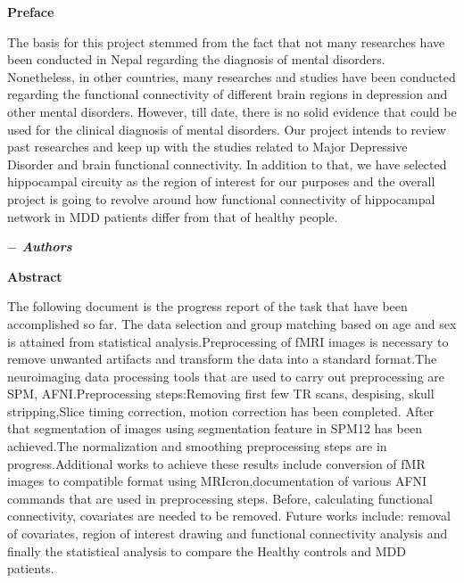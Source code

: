 \documentclass[12pt]{article}
\begin{document}


\clearpage
\setcounter{page}{1}
\hskip180pt {\textbf{\centering \Large Preface} }
\vskip40pt

\noindent
The basis for this project stemmed from the fact that not many
researches have been conducted in Nepal regarding the diagnosis of
mental disorders. Nonetheless, in other countries, many researches and
studies have been conducted regarding the functional connectivity of
different brain regions in depression and other mental
disorders. However, till date, there is no solid evidence that could
be used for the clinical diagnosis of mental disorders. Our project
intends to review past researches and keep up with the studies related
to Major Depressive Disorder and brain functional connectivity. In
addition to that, we have selected hippocampal circuity as the region
of interest for our purposes and the overall project is going to
revolve around how functional connectivity of hippocampal network in
MDD patients differ from that of healthy people.

\hspace*{133mm}\textbf{\textit {$-$ Authors}}
\newpage

\hskip180pt {\textbf{\centering \Large Abstract} }
\vskip40pt

  \noindent
  The following document is the progress report of the task that have
  been accomplished so far. The data selection and group matching
  based on age and sex is attained from statistical
  analysis.Preprocessing of fMRI images is necessary to remove
  unwanted artifacts and transform the data into a standard format.The
  neuroimaging data processing tools that are used to carry out
  preprocessing are SPM, AFNI.Preprocessing steps:Removing first few
  TR scans, despising, skull stripping,Slice timing correction, motion
  correction has been completed. After that segmentation of images
  using segmentation feature in SPM12 has been achieved.The
  normalization and smoothing preprocessing steps are in
  progress.Additional works to achieve these results include
  conversion of fMR images to compatible format using
  MRIcron,documentation of various AFNI commands that are used in
  preprocessing steps. Before, calculating functional connectivity,
  covariates are needed to be removed. Future works include: removal
  of covariates, region of interest drawing and functional
  connectivity analysis and finally the statistical analysis to
  compare the Healthy controls and MDD patients.
\end{document}
